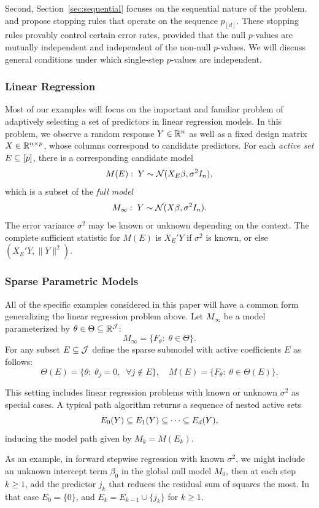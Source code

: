 \documentclass{article}
\begin{document}
Second, Section~\ref{sec:sequential} focuses on the sequential nature of the problem. \citet{gsell2013sequential} and \citet{li2015accumulation} propose stopping rules that operate on the sequence $p_{[d]}$. These stopping rules provably control certain error rates, provided that the null $p$-values are mutually independent and independent of the non-null $p$-values. We will discuss general conditions under which single-step $p$-values are independent.

\subsubsection{Linear Regression}

Most of our examples will focus on the important and familiar problem of adaptively selecting a set of predictors in linear regression models. In this problem, we observe a random response $Y\in \mathbb{R}^n$ as well as a fixed design matrix $X\in \mathbb{R}^{n \times p}$, whose columns correspond to candidate predictors. For each {\em active set} $E \subseteq [p]$, there is a corresponding candidate model
\[
M(E):\; Y \sim \mathcal{N}( X_E\beta, \sigma^2 I_n),
\]
which is a subset of the {\em full model}
\[
M_\infty:\; Y \sim \mathcal{N}(X\beta, \sigma^2I_n).
\]
The error variance $\sigma^2$ may be known or unknown depending on the context. The complete sufficient statistic for $M(E)$ is $X_E'Y$ if $\sigma^2$ is known, or else $\left(X_E'Y, \|Y\|^2\right)$.

\subsubsection{Sparse Parametric Models}\label{sec:genSparse}

All of the specific examples considered in this paper will have a common form generalizing the linear regression problem above. Let $M_\infty$ be a model parameterized by $\theta\in \Theta \subseteq \mathbb{R}^{\mathcal{J}}$:
\[
M_\infty = \{F_\theta:\; \theta \in \Theta\}.
\]
For any subset $E\subseteq \mathcal{J}$ define the sparse submodel with active coefficients $E$ as follows:
\[
\Theta(E) = \{\theta:\; \theta_j = 0, \;\;\forall j \notin E\}, 
\quad M(E) = \{F_\theta:\; \theta\in \Theta(E)\}.
\]

This setting includes linear regression problems with known or unknown $\sigma^2$ as special cases. A typical path algorithm returns a sequence of nested active sets 
\[
E_0(Y) \subseteq E_1(Y) \subseteq \cdots \subseteq E_d(Y),
\]
inducing the model path given by $M_k = M(E_k)$. 

As an example, in forward stepwise regression with known $\sigma^2$, we might include an unknown intercept term $\beta_0$ in the global null model $M_0$, then at each step $k\geq 1$, add the predictor $j_k$ that reduces the residual sum of squares the most. In that case $E_0 = \{0\}$, and $E_k = E_{k-1} \cup \{j_k\}$ for $k\geq 1$.
\end{document}
